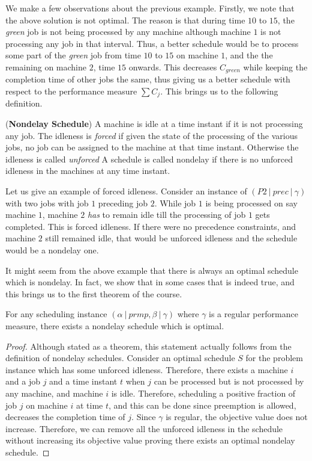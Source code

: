 \documentclass[11pt]{article}
\begin{document}
We make a few observations about the previous example. Firstly, we note that the above solution is not optimal. The reason is that during time $10$ to $15$, the {\em green} job is not being processed by any machine although machine $1$ is not processing any job in that interval. Thus, a better schedule would be to process some part of the {\em green} job from time $10$ to $15$ on machine $1$, and the the remaining on machine $2$, time $15$ onwards. This decreases $C_{green}$ while keeping the completion time of other jobs the same, thus giving us a better schedule with respect to the performance measure $\sum C_j$. This brings us to the following definition.

\begin{definition} ({\bf Nondelay Schedule}) 
A machine is idle at a time instant if it is not processing any job. 
The idleness is {\em forced} if given the state of the processing of the various jobs, 
no job can be assigned to the machine at that time instant. Otherwise the idleness is called {\em unforced}
A schedule is called nondelay if there is no unforced idleness in the machines at any time instant.
\end{definition}

Let us give an example of forced idleness. Consider an instance of $(P2 ~|~ prec ~|~ \gamma)$ with two jobs with job $1$ preceding job $2$. While job $1$ is being processed on say machine $1$, machine $2$ {\em has} to remain idle till the processing of job $1$ gets completed. This is forced idleness. If there were no precedence constraints, and machine $2$ still remained idle, that would be unforced idleness and the schedule would be a nondelay one.

It might seem from the above example that there is always an optimal schedule which is nondelay. In fact, we show that in some cases that is indeed true, and this brings us to the first theorem of the course.

\begin{theorem}
For any scheduling instance $(\alpha ~|~ prmp, \beta ~|~ \gamma)$ where $\gamma$ is a regular performance measure,
there exists a nondelay schedule which is optimal.
\end{theorem}
\begin{proof}
Although stated as a theorem, this statement actually follows from the definition of nondelay schedules. Consider an optimal schedule $S$ for the problem instance which has some unforced idleness. Therefore, there exists a machine $i$ and a job $j$ and a time instant $t$ when $j$ can be processed but is not processed by any machine, and machine $i$ is idle. Therefore, scheduling a positive fraction of job $j$ on machine $i$ at time $t$, and this can be done since preemption is allowed, decreases the completion time of $j$. Since $\gamma$ is regular, the objective value does not increase. Therefore, we can remove all the unforced idleness in the schedule without increasing its objective value proving there exists an optimal nondelay schedule.
\end{proof}
\end{document}
